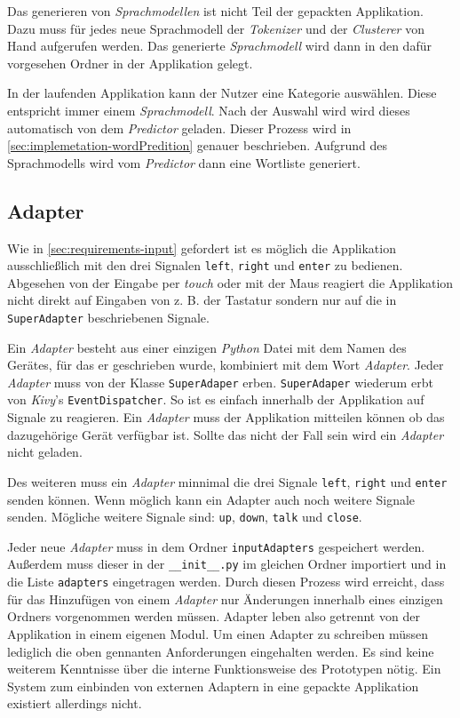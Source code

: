 		Das generieren von \emph{Sprachmodellen} ist nicht Teil der gepackten Applikation. Dazu muss für jedes neue Sprachmodell der \emph{Tokenizer} und der \emph{Clusterer} von Hand aufgerufen werden. Das generierte \emph{Sprachmodell} wird dann in den dafür vorgesehen Ordner in der Applikation gelegt.

		In der laufenden Applikation kann der Nutzer eine Kategorie auswählen. Diese entspricht immer einem \emph{Sprachmodell}. Nach der Auswahl wird wird dieses automatisch von dem \emph{Predictor} geladen. Dieser Prozess wird in \autoref{sec:implemetation-wordPredition} genauer beschrieben. Aufgrund des Sprachmodells wird vom \emph{Predictor} dann eine Wortliste generiert.
       
    \newpage
    \subsection{Adapter}
    	Wie in \autoref{sec:requirements-input} gefordert ist es möglich die Applikation ausschließlich mit den drei Signalen \texttt{left}, \texttt{right} und \texttt{enter} zu bedienen. Abgesehen von der Eingabe per \emph{touch} oder mit der Maus reagiert die Applikation nicht direkt auf Eingaben von z. B. der Tastatur sondern nur auf die in \texttt{SuperAdapter} beschriebenen Signale.  
    
    	Ein \emph{Adapter} besteht aus einer einzigen \emph{Python} Datei mit dem Namen des Gerätes, für das er geschrieben wurde, kombiniert mit dem Wort \emph{Adapter}. Jeder \emph{Adapter} muss von der Klasse \texttt{SuperAdaper} erben. \texttt{SuperAdaper} wiederum erbt von \emph{Kivy}'s \texttt{EventDispatcher}.
So ist es einfach innerhalb der Applikation auf Signale zu reagieren. Ein \emph{Adapter} muss der Applikation mitteilen können ob das dazugehörige Gerät verfügbar ist. Sollte das nicht der Fall sein wird ein \emph{Adapter} nicht geladen.

		Des weiteren muss ein \emph{Adapter} minnimal die drei Signale \texttt{left}, \texttt{right} und \texttt{enter} senden können. Wenn möglich kann ein Adapter auch noch weitere Signale senden. Mögliche weitere Signale sind: \texttt{up}, \texttt{down}, \texttt{talk} und \texttt{close}.
        
        Jeder neue \emph{Adapter} muss in dem Ordner \texttt{inputAdapters} gespeichert werden. Außerdem muss dieser in der \texttt{\_\_init\_\_.py} im gleichen Ordner importiert und in die Liste \texttt{adapters} eingetragen werden. Durch diesen Prozess wird erreicht, dass für das Hinzufügen von einem \emph{Adapter} nur Änderungen innerhalb eines einzigen Ordners vorgenommen werden müssen. Adapter leben also getrennt von der Applikation in einem eigenen Modul. Um einen Adapter zu schreiben müssen lediglich die oben gennanten Anforderungen eingehalten werden. Es sind keine weiterem Kenntnisse über die interne Funktionsweise des Prototypen nötig. Ein System zum einbinden von externen Adaptern in eine gepackte Applikation existiert allerdings nicht.
	
    \newpage